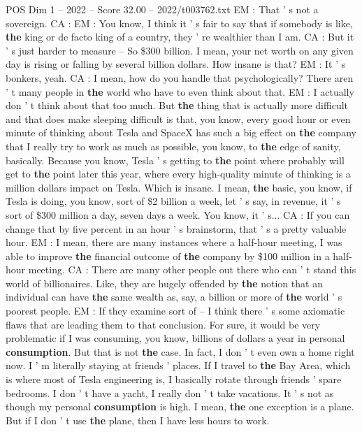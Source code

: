 \begin{textsample}{POS Dim 1 – 2022 – Score 32.00 – 2022/t003762.txt}
EM : That ' s not a sovereign.
CA : EM : You know, I think it ' s fair to say that if somebody is like, \textbf{the} king or de facto king of a country, they ' re wealthier than I am.
CA : But it ' s just harder to measure -- So \$300 billion.
I mean, your net worth on any given day is rising or falling by several billion dollars.
How insane is that?
EM : It ' s bonkers, yeah.
CA : I mean, how do you handle that psychologically?
There aren ' t many people in \textbf{the} world who have to even think about that.
EM : I actually don ' t think about that too much.
But \textbf{the} thing that is actually more difficult and that does make sleeping difficult is that, you know, every good hour or even minute of thinking about Tesla and SpaceX has such a big effect on \textbf{the} company that I really try to work as much as possible, you know, to \textbf{the} edge of sanity, basically.
Because you know, Tesla ' s getting to \textbf{the} point where probably will get to \textbf{the} point later this year, where every high-quality minute of thinking is a million dollars impact on Tesla.
Which is insane.
I mean, \textbf{the} basic, you know, if Tesla is doing, you know, sort of \$2 billion a week, let ' s say, in revenue, it ' s sort of \$300 million a day, seven days a week.
You know, it ' s...
CA : If you can change that by five percent in an hour ' s brainstorm, that ' s a pretty valuable hour.
EM : I mean, there are many instances where a half-hour meeting, I was able to improve \textbf{the} financial outcome of \textbf{the} company by \$100 million in a half-hour meeting.
CA : There are many other people out there who can ' t stand this world of billionaires.
Like, they are hugely offended by \textbf{the} notion that an individual can have \textbf{the} same wealth as, say, a billion or more of \textbf{the} world ' s poorest people.
EM : If they examine sort of -- I think there ' s some axiomatic flaws that are leading them to that conclusion.
For sure, it would be very problematic if I was consuming, you know, billions of dollars a year in personal \textbf{consumption}.
But that is not \textbf{the} case.
In fact, I don ' t even own a home right now.
I ' m literally staying at friends ' places.
If I travel to \textbf{the} Bay Area, which is where most of Tesla engineering is, I basically rotate through friends ' spare bedrooms.
I don ' t have a yacht, I really don ' t take vacations.
It ' s not as though my personal \textbf{consumption} is high.
I mean, \textbf{the} one exception is a plane.
But if I don ' t use \textbf{the} plane, then I have less hours to work.

\end{textsample}

